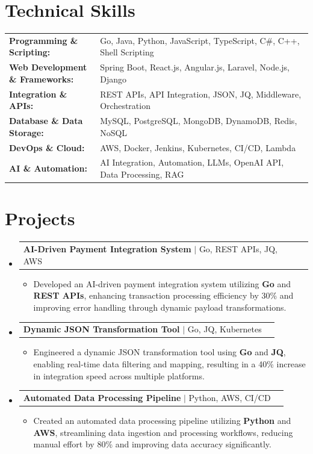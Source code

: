 \documentclass[letterpaper,10pt]{article}
\makeatletter
\newcommand{\resumeItem}[1]{
  \item{\fontsize{8pt}{9pt}\selectfont
    #1 \vspace{-3pt}
  }
}
\newcommand{\resumeProjectHeading}[2]{
    \item
    \begin{tabular*}{1.001\textwidth}{l@{\extracolsep{\fill}}r}
      \fontsize{8.5pt}{10pt}#1 & \textbf{\fontsize{8.5pt}{10pt} #2}\\
    \end{tabular*}\vspace{-7pt}
}
\newcommand{\resumeSubHeadingListStart}{\begin{itemize}[leftmargin=0pt, label={}]}
\newcommand{\resumeSubHeadingListEnd}{\end{itemize}}
\newcommand{\resumeItemListStart}{\begin{itemize}[leftmargin=*]}
\newcommand{\resumeItemListEnd}{\end{itemize}\vspace{-5pt}}
\makeatother
\begin{document}
\section{Technical Skills}
        \vspace{-14pt}
        \begin{table}[h]
            \fontsize{8pt}{9pt}\selectfont
            \begin{tabular}{p{0.3\linewidth} p{0.7\linewidth}}
                \textbf{Programming \& Scripting:} & Go, Java, Python, JavaScript, TypeScript, C\#, C++, Shell Scripting \\
                \textbf{Web Development \& Frameworks:} & Spring Boot, React.js, Angular.js, Laravel, Node.js, Django \\
                \textbf{Integration \& APIs:} & REST APIs, API Integration, JSON, JQ, Middleware, Orchestration \\
                \textbf{Database \& Data Storage:} & MySQL, PostgreSQL, MongoDB, DynamoDB, Redis, NoSQL \\
                \textbf{DevOps \& Cloud:} & AWS, Docker, Jenkins, Kubernetes, CI/CD, Lambda \\
                \textbf{AI \& Automation:} & AI Integration, Automation, LLMs, OpenAI API, Data Processing, RAG \\
            \end{tabular}
        \end{table}
 \vspace{-18pt}

\section{Projects}
    \vspace{-5pt}
    \resumeSubHeadingListStart
          \resumeProjectHeading
            {\textbf{AI-Driven Payment Integration System} $|$ Go, REST APIs, JQ, AWS}{}
            \resumeItemListStart
                \resumeItem{Developed an AI-driven payment integration system utilizing \textbf{Go} and \textbf{REST APIs}, enhancing transaction processing efficiency by 30\% and improving error handling through dynamic payload transformations.}
            \resumeItemListEnd
        \vspace{-12pt}
    
        \resumeProjectHeading
            {\textbf{Dynamic JSON Transformation Tool} $|$ Go, JQ, Kubernetes}{}
        \resumeItemListStart
                \resumeItem{Engineered a dynamic JSON transformation tool using \textbf{Go} and \textbf{JQ}, enabling real-time data filtering and mapping, resulting in a 40\% increase in integration speed across multiple platforms.}
        \resumeItemListEnd
      \vspace{-12pt}
      \resumeProjectHeading
        {\textbf{Automated Data Processing Pipeline} $|$ Python, AWS, CI/CD}{}
    \resumeItemListStart
            \resumeItem{Created an automated data processing pipeline utilizing \textbf{Python} and \textbf{AWS}, streamlining data ingestion and processing workflows, reducing manual effort by 80\% and improving data accuracy significantly.}
    \resumeItemListEnd
    \resumeSubHeadingListEnd
\end{document}
